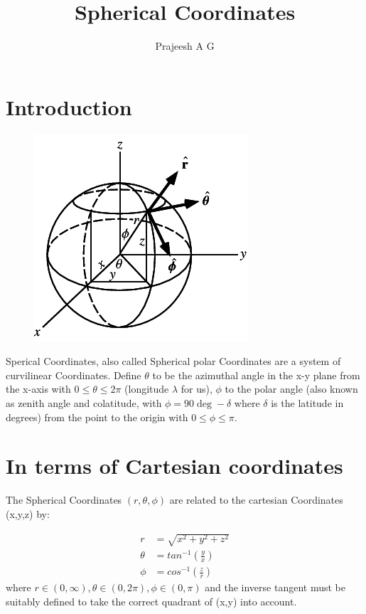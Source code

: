 \documentclass[11pt]{article}
\title{Spherical Coordinates}
\author{Prajeesh A G}
\begin{document}
\maketitle

\section{Introduction}
\label{sec:into}

\begin{figure}[H]
  \includegraphics{SphericalCoordinates.png}

\end{figure}

Sperical Coordinates, also called Spherical polar Coordinates are a system of curvilinear Coordinates. Define $\theta$ to be the azimuthal angle in the x-y plane from the x-axis with $0 \leq \theta \leq 2\pi$ (longitude $\lambda$ for us), $\phi$ to the polar angle (also known as zenith angle and colatitude, with $\phi=90\deg - \delta$ where $\delta$ is the latitude in degrees) from the point to the origin with $0 \leq \phi \leq \pi$. \par

\section{In terms of Cartesian coordinates}
\label{sec:cart}
The Spherical Coordinates $(r,\theta,\phi)$ are related to the cartesian Coordinates (x,y,z) by:

\begin{align}
  r &= \sqrt{x^2+y^2+z^2} \\
  \theta &= tan^{-1} \left(\frac{y}{x}\right) \\
  \phi &= cos^{-1} \left(\frac{z}{r}\right)
\end{align}
where $r\in(0,\infty), \theta\in(0,2\pi), \phi\in(0,\pi)$ and the inverse tangent must be suitably defined to take the correct quadrant of (x,y) into account.
\end{document}
